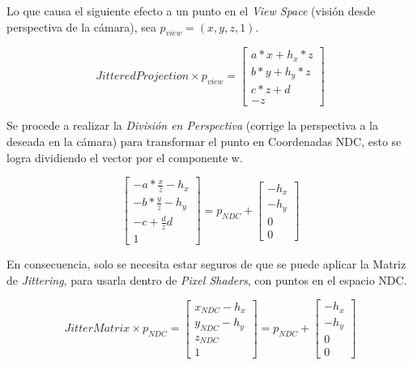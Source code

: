 \documentclass[pregrado]{tesis-usb} %
\begin{document}
Lo que causa el siguiente efecto a un punto en el \textit{View Space} (visión desde perspectiva de la cámara), sea $p_{view}=(x,y,z,1)$.

\begin{equation}
	JitteredProjection\times p_{view} = \begin{bmatrix*}
	a*x+h_x*z \\
	b*y+h_y*z \\
	c*z+d \\
	-z
	\end{bmatrix*}
\end{equation}

Se procede a realizar la \textit{División en Perspectiva} (corrige la perspectiva a la deseada en la cámara) para transformar el punto en Coordenadas NDC, esto se logra dividiendo el vector por el componente w. 

\begin{equation}
\begin{bmatrix*}
-a*\frac{x}{z}-h_x \\
-b*\frac{y}{z}-h_y \\
-c+\frac{d}{z}d \\
1
\end{bmatrix*} = p_{NDC} + \begin{bmatrix*}
-h_x \\
-h_y \\
0 \\
0
\end{bmatrix*}
\end{equation}

En consecuencia, solo se necesita estar seguros de que se puede aplicar la Matriz de \textit{Jittering}, para usarla dentro de \textit{Pixel Shaders}, con puntos en el espacio NDC.

\begin{equation}
	JitterMatrix\times p_{NDC} = \begin{bmatrix*}
	x_{NDC}-h_x \\
	y_{NDC}-h_y \\
	z_{NDC} \\
	1
	\end{bmatrix*} = p_{NDC} + \begin{bmatrix*}
	-h_x \\
	-h_y \\
	0 \\
	0
	\end{bmatrix*}
\end{equation}
\end{document}
